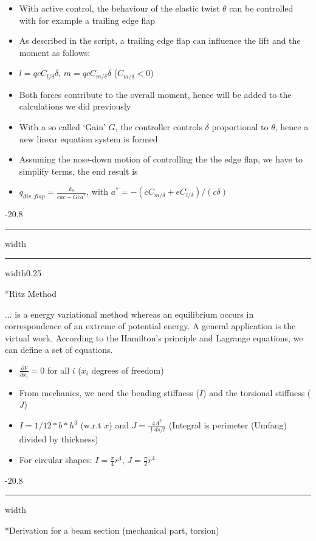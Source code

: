 \documentclass[8pt, landscape, fleqn]{scrartcl}
\makeatletter
\renewcommand{\subsection}{\@startsection{subsection}{1}{0mm}%
{-2\baselineskip}{0.8\baselineskip}%
{\hrule depth 0.2pt width\columnwidth\hrule depth0.75pt
width0.25\columnwidth\vspace*{1.2em}\large\bfseries\rmfamily}}
\renewcommand{\subsubsection}{\@startsection{subsubsection}{1}{0mm}%
{-2\baselineskip}{0.8\baselineskip}%
{\hrule depth 0.2pt width\columnwidth\vspace*{1.2em}\normalsize\bfseries\rmfamily}}
\makeatother
\begin{document}
\begin{multicols*}{3}
\begin{itemize}
    \item With active control, the behaviour of the elastic twist $\theta$ can be controlled with for example a trailing edge flap
    \item As described in the script, a trailing edge flap can influence the lift and the moment as follows:
    \item $l = qc C_{l/\delta} \delta$, $m = qcC_{m/\delta} \delta$ ($C_{m/\delta} < 0$)
    \item Both forces contribute to the overall moment, hence will be added to the calculations we did previously
    \item With a so called `Gain' $G$, the controller controls $\delta$ proportional to $\theta$, hence a new linear equation system is formed
    \item Assuming the nose-down motion of controlling the the edge flap, we have to simplify terms, the end result is 
    \item $q_{div,flap}= \frac{k_\theta}{cae - Gca^*}$, with $a^* = -(cC_{m/\delta}+eC_{l/\delta})/(c\delta)$
\end{itemize}

\subsection*{Ritz Method}

... is a energy variational method whereas an equilibrium occurs in correspondence of an extreme of potential energy. A general application is the virtual work.
According to the Hamilton's principle and Lagrange equations, we can define a set of equations.

\begin{itemize}
    \item $\frac{\partial V}{\partial x_i} = 0$ for all $i$ ($x_i$ degrees of freedom)
    \item From mechanics, we need the bending stiffness ($I$) and the torsional stiffness ($J$)
    \item $I = 1/12*b*h^3$ (w.r.t $x$) and $J = \frac{4 A^2}{\int ds/t}$ (Integral is perimeter (Umfang) divided by thickness)
    \item For circular shapes: $I = \frac{\pi}{4}r^4$, $J= \frac{\pi}{2}r^4$
\end{itemize}


\subsubsection*{Derivation for a beam section (mechanical part, torsion)}


\end{multicols*}
\end{document}
